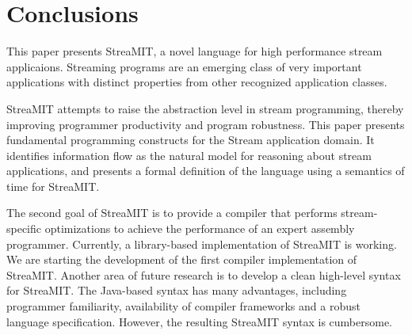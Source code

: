 \section{Conclusions}
\label{sec:conc}
This paper presents StreaMIT, a novel language for high performance
stream applicaions.  Streaming programs are an emerging class of very
important applications with distinct properties from other recognized
application classes.

StreaMIT attempts to raise the abstraction level in stream
programming, thereby improving programmer productivity and program
robustness. This paper presents fundamental programming constructs for
the Stream application domain. It identifies information flow as the
natural model for reasoning about stream applications, and presents a
formal definition of the language using a semantics of time for
StreaMIT.

The second goal of StreaMIT is to provide a compiler that performs
stream-specific optimizations to achieve the performance of an expert
assembly programmer. Currently, a library-based implementation of
StreaMIT is working. We are starting the development of the first
compiler implementation of StreaMIT. Another area of future research
is to develop a clean high-level syntax for StreaMIT. The Java-based
syntax has many advantages, including programmer familiarity,
availability of compiler frameworks and a robust language
specification. However, the resulting StreaMIT syntax is cumbersome.
